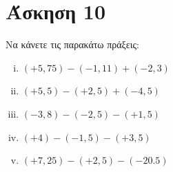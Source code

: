 \documentclass[a4paper,10pt]{report}
\begin{document}
\section*{Άσκηση 10  \hfill \small{}}%
Να κάνετε τις παρακάτω πράξεις:
\begin{enumerate}[i)]
\item $(+5,75)-(-1,11)+(-2,3)$
\item $(+5,5)-(+2,5)+(-4,5)$
\item $(-3,8)-(-2,5)-(+1,5)$
\item $(+4)-(-1,5)-(+3,5)$
\item $(+7,25)-(+2,5)-(-20.5)$
\end{enumerate}
\end{document}
